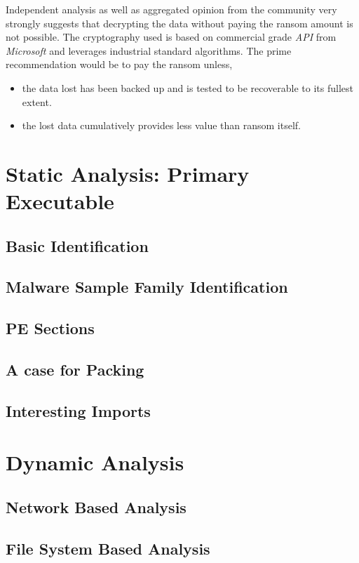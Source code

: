 \documentclass[10pt,a4paper]{article}
\begin{document}
Independent analysis as well as aggregated opinion from the community very strongly suggests that decrypting the data without paying the ransom amount is not possible.
The cryptography used is based on commercial grade \textit{API} from \textit{Microsoft} and leverages industrial standard algorithms.
The prime recommendation would be to pay the ransom unless,
\begin{itemize}
	\item the data lost has been backed up and is tested to be recoverable to its fullest extent.
	\item the lost data cumulatively provides less value than ransom itself.
\end{itemize}

\newpage

\section{Static Analysis: Primary Executable}
	\subsection{Basic Identification}
	\subsection{Malware Sample Family Identification}
	\subsection{PE Sections}
	\subsection{A case for Packing}
	\subsection{Interesting Imports}

\section{Dynamic Analysis}
	\subsection{Network Based Analysis}
	\subsection{File System Based Analysis}
\end{document}
